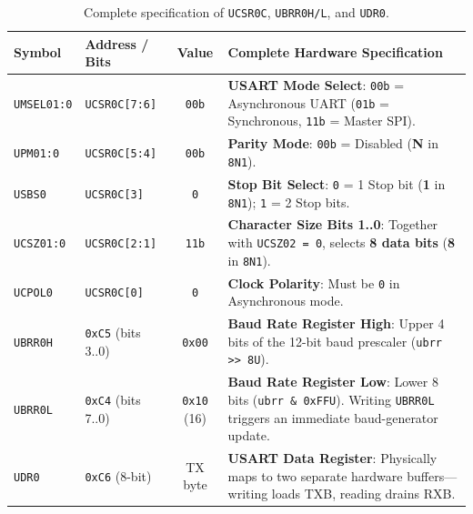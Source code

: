 \documentclass[11pt,a4paper,oneside]{report}
\begin{document}
\begin{table}[!htbp]
\centering
\caption{Complete specification of \texttt{UCSR0C}, \texttt{UBRR0H/L}, and \texttt{UDR0}.}
\label{tab:ch3_ucsr0c}
\begin{tabularx}{\linewidth}{l l c X}
\toprule
\textbf{Symbol} & \textbf{Address / Bits} & \textbf{Value} & \textbf{Complete Hardware Specification} \\
\midrule
\texttt{UMSEL01:0} & \texttt{UCSR0C[7:6]} & \texttt{00b} & \textbf{USART Mode Select}: \texttt{00b} = Asynchronous UART (\texttt{01b} = Synchronous, \texttt{11b} = Master SPI). \\
\texttt{UPM01:0} & \texttt{UCSR0C[5:4]} & \texttt{00b} & \textbf{Parity Mode}: \texttt{00b} = Disabled (\textbf{N} in \texttt{8N1}). \\
\texttt{USBS0} & \texttt{UCSR0C[3]} & \texttt{0} & \textbf{Stop Bit Select}: \texttt{0} = 1 Stop bit (\textbf{1} in \texttt{8N1}); \texttt{1} = 2 Stop bits. \\
\texttt{UCSZ01:0} & \texttt{UCSR0C[2:1]} & \texttt{11b} & \textbf{Character Size Bits 1..0}: Together with \texttt{UCSZ02 = 0}, selects \textbf{8 data bits} (\textbf{8} in \texttt{8N1}). \\
\texttt{UCPOL0} & \texttt{UCSR0C[0]} & \texttt{0} & \textbf{Clock Polarity}: Must be \texttt{0} in Asynchronous mode. \\
\texttt{UBRR0H} & \texttt{0xC5} (bits 3..0) & \texttt{0x00} & \textbf{Baud Rate Register High}: Upper 4 bits of the 12-bit baud prescaler (\texttt{ubrr >> 8U}). \\
\texttt{UBRR0L} & \texttt{0xC4} (bits 7..0) & \texttt{0x10} (16) & \textbf{Baud Rate Register Low}: Lower 8 bits (\texttt{ubrr \& 0xFFU}). Writing \texttt{UBRR0L} triggers an immediate baud-generator update. \\
\texttt{UDR0} & \texttt{0xC6} (8-bit) & TX byte & \textbf{USART Data Register}: Physically maps to two separate hardware buffers---writing loads TXB, reading drains RXB. \\
\bottomrule
\end{tabularx}
\end{table}
\end{document}

